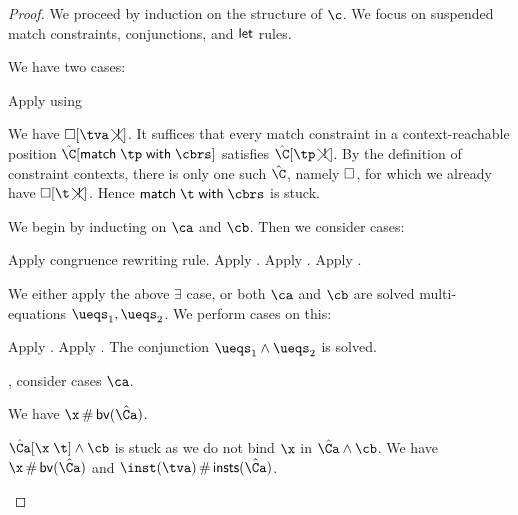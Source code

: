 \documentclass[acmsmall,screen,nonacm%
\Anonymous{,anonymous}{}%
\Final{}{,review}%
]{acmart}
\begin{document}
\begin{proof}
  We proceed by induction on the structure of $\c$. We
  focus on suspended match constraints, conjunctions, and $\mathopen{}\mathrel{\mathsf{let}}$ rules.
  \begin{proofcases}
    \proofcase{$\cmatch \t \cbrs$}
      We have two cases:
      \begin{proofcases}
   Apply  using 

	  We have $\nCshape \hole \tv$. It suffices
	  that every match constraint in a context-reachable position
	  $\hat\C\where{\cmatch \tp \cbrs}$ satisfies $\nCshape {\hat\C} \tp$.
	  By the definition of constraint contexts, there is only one such
	  $\hat\C$, namely $\square$, for which we already have $\nCshape \hole \t$.
	  Hence $\cmatch \t \cbrs$ is stuck.
      \end{proofcases}

    \proofcase{$\ca \cand \cb$}
    We begin by inducting on $\ca$ and $\cb$. Then we consider cases:
    \begin{proofcases}
       Apply congruence rewriting rule.
       Apply .
       Apply .
       Apply .

	We either apply the above $\exists$ case, or both $\ca$ and $\cb$ are solved
	multi-equations $\ueqs_1, \ueqs_2$. We perform cases on this:
	\begin{proofcases}
	   Apply .
	   Apply .
	   The conjunction $\ueqs_1 \cand \ueqs_2$ is solved.
	\end{proofcases}


	\Wlog, consider cases $\ca$.
	\begin{proofcases}
	  \proofcase{$\hat\Ca\where{\capp \x \t}$}
	    We have $\x \disjoint \bvs {\hat\Ca}$.

	    $\hat\Ca\where{\capp \x \t} \cand \cb$ is stuck as we do not bind $\x$ in $\hat\Ca \cand \cb$.
	  \proofcase{$\hat\Ca\where{\cpapp \x \tv \tvc \inst}$}
      We have $\x \disjoint \bvs {\hat \Ca}$ and $\inst(\tv) \disjoint \insts {\hat \Ca}$.


\end{proofcases}
\end{proofcases}
\end{proofcases}
\end{proof}
\end{document}
